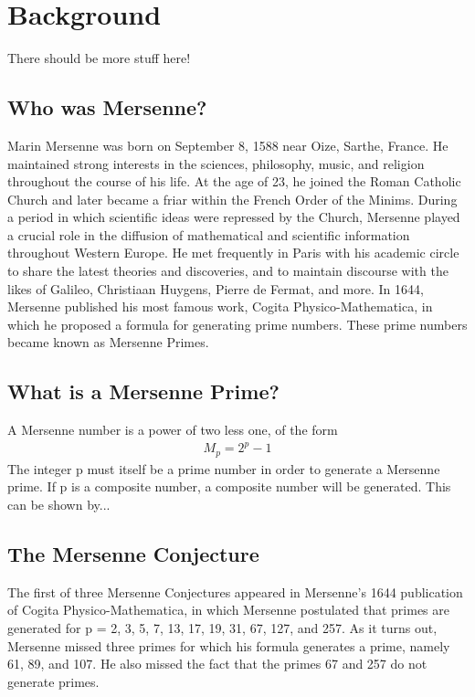 \section{Background}
There should be more stuff here!


\subsection{Who was Mersenne?}
Marin Mersenne was born on September 8, 1588 near Oize, Sarthe, France. He maintained
strong interests in the sciences, philosophy, music, and religion throughout the course of his
life. At the age of 23, he joined the Roman Catholic Church and later became a friar within
the French Order of the Minims. During a period in which scientific ideas were repressed by
the Church, Mersenne played a crucial role in the diffusion of mathematical and scientific
information throughout Western Europe. He met frequently in Paris with his academic circle
to share the latest theories and discoveries, and to maintain discourse with the likes of Galileo,
Christiaan Huygens, Pierre de Fermat, and more. In 1644, Mersenne published his most famous
work, Cogita Physico-Mathematica, in which he proposed a formula for generating prime
numbers. These prime numbers became known as Mersenne Primes.

\subsection{What is a Mersenne Prime?}
A Mersenne number is a power of two less one, of the form
\begin{align}
M_p = 2^p - 1
\end{align}
The integer p must itself be a prime number in order to generate a Mersenne prime. If p is a
composite number, a composite number will be generated. This can be shown by...

\subsection{The Mersenne Conjecture}

The first of three Mersenne Conjectures appeared in Mersenne’s 1644 publication of Cogita
Physico-Mathematica, in which Mersenne postulated that primes are generated for p = 2, 3, 5,
7, 13, 17, 19, 31, 67, 127, and 257. As it turns out, Mersenne missed three primes for which his
formula generates a prime, namely 61, 89, and 107. He also missed the fact that the primes 67
and 257 do not generate primes.

